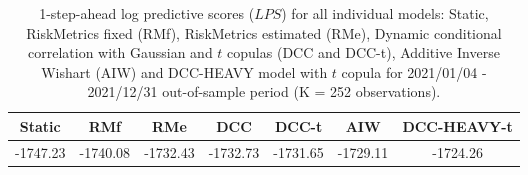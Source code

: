 \begin{table}[ht]
\centering
\caption{1-step-ahead log predictive scores ($LPS$) 
             for all individual models: Static, RiskMetrics fixed (RMf),
RiskMetrics estimated (RMe), 
Dynamic conditional correlation with Gaussian and $t$ copulas (DCC
and DCC-t), Additive Inverse Wishart (AIW) and DCC-HEAVY model with $t$ copula for 
2021/01/04 - 2021/12/31 out-of-sample period
(K = 252 observations).} 
\label{table:lps_EX}
\begin{tabular}{cccccc|c}
  \hline
Static & RMf & RMe & DCC & DCC-t & AIW & DCC-HEAVY-t \\ 
  \hline
-1747.23 & -1740.08 & -1732.43 & -1732.73 & -1731.65 & -1729.11 & -1724.26 \\ 
   \hline
\end{tabular}
\end{table}
